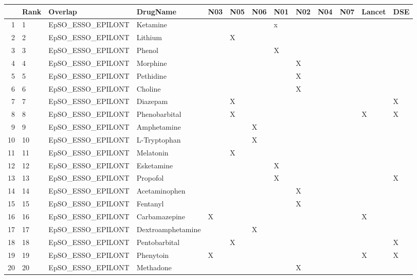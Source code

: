\begin{table}[ht]
\centering
\begin{tabular}{rllllllllllll}
  \hline
 & Rank & Overlap & DrugName & N03 & N05 & N06 & N01 & N02 & N04 & N07 & Lancet & DSE \\ 
  \hline
1 & 1 & EpSO\_ESSO\_EPILONT & Ketamine &  &  &  & x &  &  &  &  &  \\ 
  2 & 2 & EpSO\_ESSO\_EPILONT & Lithium &  & X &  &  &  &  &  &  &  \\ 
  3 & 3 & EpSO\_ESSO\_EPILONT & Phenol &  &  &  & X &  &  &  &  &  \\ 
  4 & 4 & EpSO\_ESSO\_EPILONT & Morphine &  &  &  &  & X &  &  &  &  \\ 
  5 & 5 & EpSO\_ESSO\_EPILONT & Pethidine &  &  &  &  & X &  &  &  &  \\ 
  6 & 6 & EpSO\_ESSO\_EPILONT & Choline &  &  &  &  & X &  &  &  &  \\ 
  7 & 7 & EpSO\_ESSO\_EPILONT & Diazepam &  & X &  &  &  &  &  &  & X \\ 
  8 & 8 & EpSO\_ESSO\_EPILONT & Phenobarbital &  & X &  &  &  &  &  & X & X \\ 
  9 & 9 & EpSO\_ESSO\_EPILONT & Amphetamine &  &  & X &  &  &  &  &  &  \\ 
  10 & 10 & EpSO\_ESSO\_EPILONT & L-Tryptophan &  &  & X &  &  &  &  &  &  \\ 
  11 & 11 & EpSO\_ESSO\_EPILONT & Melatonin &  & X &  &  &  &  &  &  &  \\ 
  12 & 12 & EpSO\_ESSO\_EPILONT & Esketamine &  &  &  & X &  &  &  &  &  \\ 
  13 & 13 & EpSO\_ESSO\_EPILONT & Propofol &  &  &  & X &  &  &  &  & X \\ 
  14 & 14 & EpSO\_ESSO\_EPILONT & Acetaminophen &  &  &  &  & X &  &  &  &  \\ 
  15 & 15 & EpSO\_ESSO\_EPILONT & Fentanyl &  &  &  &  & X &  &  &  &  \\ 
  16 & 16 & EpSO\_ESSO\_EPILONT & Carbamazepine & X &  &  &  &  &  &  & X &  \\ 
  17 & 17 & EpSO\_ESSO\_EPILONT & Dextroamphetamine &  &  & X &  &  &  &  &  &  \\ 
  18 & 18 & EpSO\_ESSO\_EPILONT & Pentobarbital &  & X &  &  &  &  &  &  & X \\ 
  19 & 19 & EpSO\_ESSO\_EPILONT & Phenytoin & X &  &  &  &  &  &  & X & X \\ 
  20 & 20 & EpSO\_ESSO\_EPILONT & Methadone &  &  &  &  & X &  &  &  &  \\ 

\end{tabular}
\end{table}
